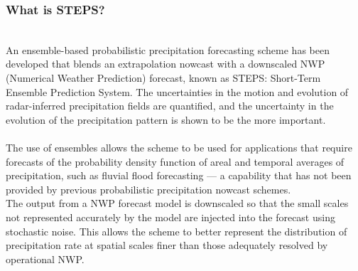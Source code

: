 \documentclass[../paper.tex]{subfiles}
\begin{document}
    \subsubsection{What is STEPS?}
        \hfill\\
        An ensemble-based probabilistic precipitation forecasting scheme has been developed that blends an extrapolation nowcast with a downscaled NWP
        (Numerical Weather Prediction) forecast,
        known as STEPS: Short-Term Ensemble Prediction System.
        The uncertainties in the motion and evolution of radar-inferred precipitation fields are quantified,
        and the uncertainty in the evolution of the precipitation pattern is shown to be the more important. \\\\
        The use of ensembles allows the scheme
        to be used for applications
        that require forecasts of the probability density function of areal and temporal averages of precipitation,
        such as fluvial flood forecasting --- a capability
        that has not been provided by previous probabilistic precipitation nowcast schemes. \\
        The output from a NWP forecast model is downscaled
        so that the small scales not represented accurately by the model are injected into the forecast
        using stochastic noise.
        This allows the scheme
        to better represent the distribution of precipitation rate at spatial scales finer than those
        adequately resolved by operational NWP\@.
\end{document}
